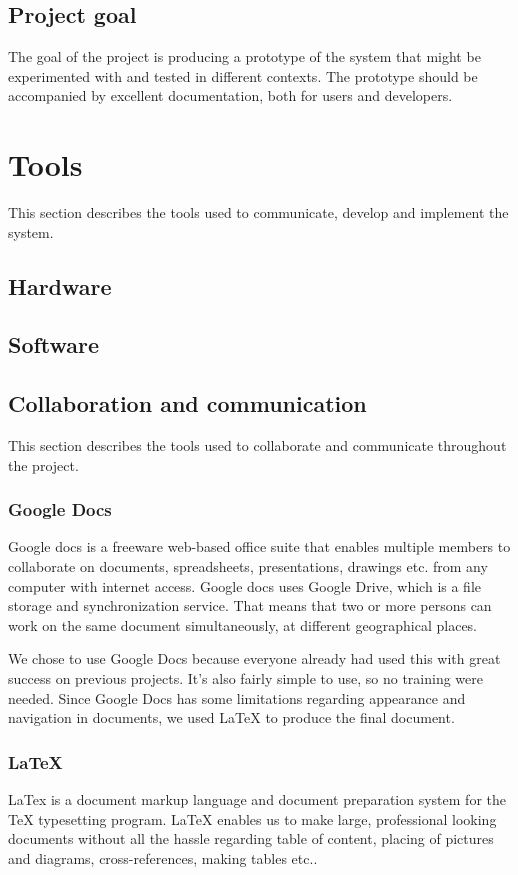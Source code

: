 \documentclass[11pt]{book}
\begin{document}
\subsection{Project goal}
The goal of the project is producing a prototype of the system that might be experimented with and tested in different contexts. The prototype should be accompanied by excellent documentation, both for users and developers.

\section{Tools}
This section describes the tools used to communicate, develop and implement the system.

\subsection{Hardware}

\subsection{Software}

\subsection{Collaboration and communication}
This section describes the tools used to collaborate and communicate throughout the project.

\subsubsection{Google Docs}
Google docs is a freeware web-based office suite that enables multiple members to collaborate on documents, spreadsheets, presentations, drawings etc. from any computer with internet access. Google docs uses Google Drive, which is a file storage and synchronization service. That means that two or more persons can work on the same document simultaneously, at different geographical places. 

We chose to use Google Docs because everyone already had used this with great success on previous projects. It’s also fairly simple to use, so no training were needed. Since Google Docs has some limitations regarding appearance and navigation in documents, we used LaTeX to produce the final document.

\subsubsection{LaTeX}
LaTex is a document markup language and document preparation system for the TeX typesetting program. LaTeX enables us to make large, professional looking documents without all the hassle regarding table of content, placing of pictures and diagrams, cross-references, making tables etc.. 
\end{document}
